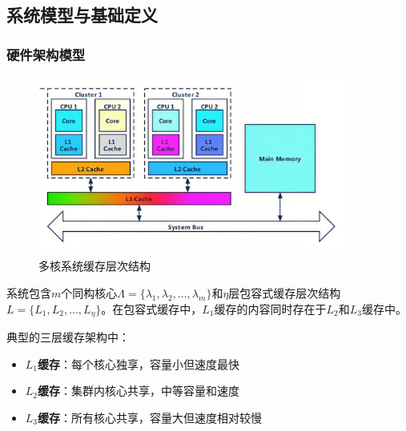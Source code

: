 \subsection{系统模型与基础定义}

\subsubsection{硬件架构模型}
\begin{figure}[H]
\centering
\includegraphics[width=0.9\textwidth]{img/cache_hierarchy.png}

\centering

\caption{多核系统缓存层次结构}
\label{fig:cache_hierarchy}
\end{figure}
系统包含$m$个同构核心$\Lambda = \{\lambda_1, \lambda_2, ..., \lambda_m\}$和$\eta$层包容式缓存层次结构$L = \{L_1, L_2, ..., L_\eta\}$。在包容式缓存中，$L_1$缓存的内容同时存在于$L_2$和$L_3$缓存中。\cite{r3_Cache-Aware_Task_Scheduling}



典型的三层缓存架构中：
\begin{tcolorbox}[
    colback=yellow!10!white,
    colframe=orange!50!black,
    arc=3pt,
    left=5pt,
    right=5pt
]
\begin{itemize}    \item \textbf{$L_1$缓存}：每个核心独享，容量小但速度最快
    \item \textbf{$L_2$缓存}：集群内核心共享，中等容量和速度
    \item \textbf{$L_3$缓存}：所有核心共享，容量大但速度相对较慢
\end{itemize}
\end{tcolorbox}

